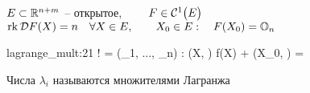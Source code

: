 \begin{theorem}
	$ E \sub \R^{n + m} $ -- открытое, $ \qquad F \in \Cont[1]E $ \\
	$ \rk \mc{D}F(X) = n \quad \forall X \in E, \qquad X_0 \in E : \quad F(X_0) = \On $
	\begin{equ}{lagrange_mult:21}
		\implies \exist! \Lambda = (\lambda_1, ..., \lambda_n) : \quad {} \vphi(X, \Lambda)  f(X) + \Lambda {} \qquad \nabla \vphi(X_0, \Lambda) = 
	\end{equ}
\end{theorem}

\begin{remark}
	Числа $ \lambda_i $ называются множителями Лагранжа
\end{remark}

